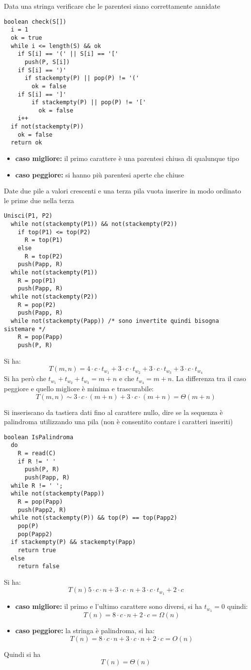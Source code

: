 \documentclass[a4paper,12pt,oneside,tikz]{book}
\begin{document}
\begin{esercizio}
	Data una stringa verificare che le parentesi siano correttamente annidate
	\begin{verbatim}
boolean check(S[])
  i = 1
  ok = true
  while i <= length(S) && ok
    if S[i] == '(' || S[i] == '['
      push(P, S[i])
    if S[i] == ')'
      if stackempty(P) || pop(P) != '('
        ok = false
    if S[i] == ']'
        if stackempty(P) || pop(P) != '['
          ok = false
    i++
  if not(stackempty(P))
    ok = false
  return ok
\end{verbatim}
	\begin{itemize}
		\item \textbf{caso migliore:} il primo carattere è una parentesi chiusa di qualunque tipo
		\item \textbf{caso peggiore:} si hanno più parentesi aperte che chiuse
	\end{itemize}
\end{esercizio}
\begin{esercizio}
	Date due pile a valori crescenti e una terza pila vuota inserire in modo ordinato le prime due nella terza
	\begin{verbatim}
Unisci(P1, P2)
  while not(stackempty(P1)) && not(stackempty(P2))
    if top(P1) <= top(P2)
      R = top(P1)
    else
      R = top(P2)
    push(Papp, R)
  while not(stackempty(P1))
    R = pop(P1)
    push(Papp, R)
  while not(stackempty(P2))
    R = pop(P2)
    push(Papp, R)
  while not(stackempty(Papp)) /* sono invertite quindi bisogna sistemare */
    R = pop(Papp)
    push(P, R)
\end{verbatim}
	Si ha:
	$$T(m,n)=4\cdot c\cdot t_{w_1}+3\cdot c\cdot t_{w_2}+3\cdot c\cdot t_{w_3}+3\cdot c\cdot t_{w_4}$$
	Si ha però che $t_{w_1}+t_{w_2}+t_{w_3}=m+n$ e che $t_{w_4}=m+n$. La differenza tra il caso peggiore e quello migliore è minima e trascurabile:
	$$T(m,n)\sim 3\cdot c\cdot (m+n)+3\cdot c\cdot (m+n)=\Theta(m+n)$$
\end{esercizio}
\begin{esercizio}
	Si inseriscano da tastiera dati fino al carattere nullo, dire se la sequenza è palindroma utilizzando una pila (non è consentito contare i caratteri inseriti)
	\begin{verbatim}
boolean IsPalindroma
  do
    R = read(C)
    if R != ' '
      push(P, R)
      push(Papp, R)
  while R != ' ';
  while not(stackempty(Papp))
    R = pop(Papp)
    push(Papp2, R)
  while not(stackempty(P)) && top(P) == top(Papp2)
    pop(P)
    pop(Papp2)
  if stackempty(P) && stackempty(Papp)
    return true
  else
    return false
\end{verbatim}
	Si ha:
	$$T(n)5\cdot c\cdot n+3\cdot c\cdot n+3\cdot c\cdot t_{w_1}+2\cdot c$$
	\begin{itemize}
		\item \textbf{caso migliore:} il primo e l'ultimo carattere sono diversi, si ha $t_{w_1}=0$ quindi:
		      $$T(n)=8\cdot c\cdot n+2\cdot c=\Omega(n)$$
		\item \textbf{caso peggiore:} la stringa è palindroma, si ha:
		      $$T(n)=8\cdot c\cdot n+3\cdot c\cdot n+2\cdot c=O(n)$$
	\end{itemize}
	Quindi si ha $$T(n)=\Theta(n)$$
\end{esercizio}
\end{document}
